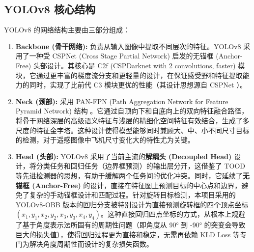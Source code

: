 \documentclass[12pt, a4paper]{report}
\begin{document}
\subsection{YOLOv8 核心结构}
YOLOv8 的网络结构主要由三部分组成：
\begin{enumerate}
    \item \textbf{Backbone (骨干网络):} 负责从输入图像中提取不同层次的特征。YOLOv8 采用了一种受 CSPNet (Cross Stage Partial Network) 启发的无锚框 (Anchor-Free) 头部设计。其核心是 C2f (CSPDarknet with 2 convolutions, faster) 模块，它通过更丰富的梯度流分支和更轻量的设计，在保证感受野和特征提取能力的同时，实现了比前代 C3 模块更优的性能（其设计思想源自 CSPNet \cite{cspnet}）。
    \item \textbf{Neck (颈部):} 采用 PAN-FPN (Path Aggregation Network for Feature Pyramid Network) 结构 \cite{panet}。它通过自顶向下和自底向上的双向特征融合路径，将骨干网络深层的高级语义特征与浅层的精细化空间特征有效结合，生成了多尺度的特征金字塔。这种设计使得模型能够同时兼顾大、中、小不同尺寸目标的检测，对于遥感图像中飞机尺寸变化大的特性尤为关键。
    \item \textbf{Head (头部):} YOLOv8 采用了当前主流的\textbf{解耦头 (Decoupled Head)} 设计，将分类任务和回归任务（边界框预测）的输出层分开，这借鉴了 TOOD \cite{tood} 等先进检测器的思想，有助于缓解两个任务间的优化冲突。同时，它延续了\textbf{无锚框 (Anchor-Free)} 的设计，直接在特征图上预测目标的中心点和边界，避免了复杂的手动锚框设计和匹配过程。针对旋转目标检测，本项目采用的 YOLOv8-OBB 版本的回归分支被特别设计为直接预测旋转框的四个顶点坐标 $(x_1, y_1, x_2, y_2, x_3, y_3, x_4, y_4)$。这种直接回归四点坐标的方式，从根本上规避了基于角度表示法所固有的周期性问题（即角度从 90° 到 -90° 的突变会导致巨大的损失值），使得回归过程更为直接和稳定，无需再依赖 KLD Loss \cite{gwd} 等专门为解决角度周期性而设计的复杂损失函数。
\end{enumerate}
\end{document}
